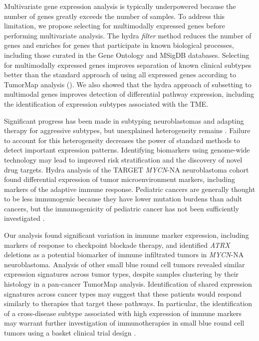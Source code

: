 \documentclass[10pt,letterpaper]{article}
\begin{document}
Multivariate gene expression analysis is typically underpowered because the number of genes greatly exceeds the number of samples. To address this limitation, we propose selecting for multimodally expressed genes before performing multivariate analysis. The hydra \textit{filter} method reduces the number of genes and enriches for genes that participate in known biological processes, including those curated in the Gene Ontology and MSigDB databases. Selecting for multimodally expressed genes improves separation of known clinical subtypes better than the standard approach of using all expressed genes according to TumorMap analysis (). We also showed that the hydra approach of subsetting to multimodal genes improves detection of differential pathway expression, including the identification of expression subtypes associated with the TME.

Significant progress has been made in subtyping neuroblastomas and adapting therapy for aggressive subtypes, but unexplained heterogeneity remains \cite{morgensternChallengeDefiningUltrahighrisk2019}. Failure to account for this heterogeneity decreases the power of standard methods to detect important expression patterns. Identifying biomarkers using genome-wide technology may lead to improved risk stratification and the discovery of novel drug targets. Hydra analysis of the TARGET \textit{MYCN}-NA neuroblastoma cohort found differential expression of tumor microenvironment markers, including markers of the adaptive immune response. Pediatric cancers are generally thought to be less immunogenic because they have lower mutation burdens than adult cancers, but the immunogenicity of pediatric cancer has not been sufficiently investigated \cite{majzner2017harnessing, zamoraPediatricPatientsAcute2019}.

Our analysis found significant variation in immune marker expression, including markers of response to checkpoint blockade therapy, and identified \textit{ATRX} deletions as a potential biomarker of immune infiltrated tumors in \textit{MYCN}-NA neuroblastoma. Analysis of other small blue round cell tumors revealed similar expression signatures across tumor types, despite samples clustering by their histology in a pan-cancer TumorMap analysis. Identification of shared expression signatures across cancer types may suggest that these patients would respond similarly to therapies that target these pathways. In particular, the identification of a cross-disease subtype associated with high expression of immune markers may warrant further investigation of immunotherapies in small blue round cell tumors using a basket clinical trial design \cite{cunananEfficientBasketTrial2017}.
\end{document}
